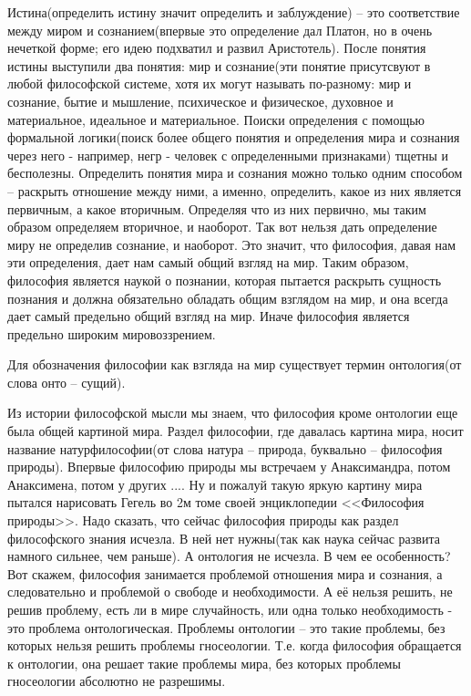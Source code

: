 Истина(определить истину значит определить и заблуждение) – это соответствие между миром и сознанием(впервые это определение дал Платон, но в очень нечеткой форме; его идею подхватил и развил Аристотель). После понятия истины выступили два понятия: мир и сознание(эти понятие присутсвуют в любой философской системе, хотя их могут называть по-разному: мир и сознание, бытие и мышление, психическое и физическое, духовное и материальное, идеальное и материальное. Поиски определения с помощью формальной логики(поиск более общего понятия и определения мира и сознания через него - например, негр - человек с определенными признаками) тщетны и бесполезны. Определить понятия мира и сознания можно только одним способом – раскрыть отношение между ними, а именно, определить, какое из них является первичным, а какое вторичным. Определяя что из них первично, мы таким образом определяем вторичное, и наоборот. Так вот нельзя дать определение миру не определив сознание, и наоборот. Это значит, что философия, давая нам эти определения, дает нам самый общий взгляд на мир. Таким образом, философия является наукой о познании, которая пытается раскрыть сущность познания и должна обязательно обладать общим взглядом на мир, и она всегда дает самый предельно общий взгляд на мир. Иначе философия является предельно широким мировоззрением.

Для обозначения философии как взгляда на мир существует термин онтология(от слова онто – сущий).

Из истории философской мысли мы знаем, что философия кроме онтологии еще была общей картиной мира. Раздел философии, где давалась картина мира, носит название натурфилософии(от слова натура – природа, буквально – философия природы). Впервые философию природы мы встречаем у Анаксимандра, потом Анаксимена, потом у других .... Ну и пожалуй такую яркую картину мира пытался нарисовать Гегель во 2м томе своей энциклопедии <<Философия природы>>. Надо сказать, что сейчас философия природы как раздел философского знания исчезла. В ней нет нужны(так как наука сейчас развита намного сильнее, чем раньше). А онтология не исчезла. В чем ее особенность? Вот скажем, философия занимается проблемой отношения мира и сознания, а следовательно и проблемой о свободе и необходимости. А её нельзя решить, не решив проблему, есть ли в мире случайность, или одна только необходимость - это проблема онтологическая. Проблемы онтологии – это такие проблемы, без которых нельзя решить проблемы гносеологии. Т.е. когда философия обращается к онтологии, она решает такие проблемы мира, без которых проблемы гносеологии абсолютно не разрешимы.

